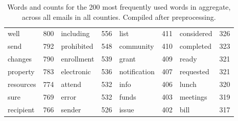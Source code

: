 \documentclass{pnastwo}
\begin{document}
\begin{article}
\begin{table*}
\begin{tabular}{lr|lr|lr|lr}
   well &  800 & including & 556 & list & 411 & considered & 326 \\ 
   send &  792 & prohibited & 548 & community & 410 & completed & 323 \\ 
   changes &  790 & enrollment & 539 & grant & 409 & ready & 321 \\ 
   property &  783 & electronic & 536 & notification & 407 & requested & 321 \\ 
   resources &  774 & attend & 532 & info & 406 & lunch & 320 \\ 
   sure &  769 & error & 532 & funds & 403 & meetings & 319 \\ 
   recipient &  766 & \cellcolor{lred} sender & 526 & issue & 402 & bill & 317 \\ 
   \bottomrule
\end{tabular}
\caption{\label{tab: top words} Words and counts for the 200 most frequently used words in aggregate, across all emails in all counties. Compiled after preprocessing.\\ \bigskip}
\end{table*}





\end{article}
\end{document}
